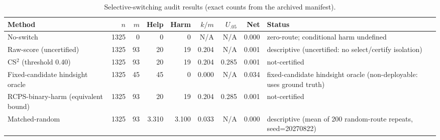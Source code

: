 \begin{table}[t]
\centering
\caption{Selective-switching audit results (exact counts from the archived manifest).}
\label{tab:cs2_main}
\begin{tabular}{lrrrrrrrl}
\toprule
Method & $n$ & $m$ & Help & Harm & $k/m$ & $U_{.05}$ & Net & Status \\
\midrule
No-switch & 1325 & 0 & 0 & 0 & N/A & N/A & 0.000 & zero-route; conditional harm undefined \\
Raw-score (uncertified) & 1325 & 93 & 20 & 19 & 0.204 & N/A & 0.001 & descriptive (uncertified: no select/certify isolation) \\
CS$^2$ (threshold 0.40) & 1325 & 93 & 20 & 19 & 0.204 & 0.285 & 0.001 & not-certified \\
Fixed-candidate hindsight oracle & 1325 & 45 & 45 & 0 & 0.000 & N/A & 0.034 & fixed-candidate hindsight oracle (non-deployable: uses ground truth) \\
RCPS-binary-harm (equivalent bound) & 1325 & 93 & 20 & 19 & 0.204 & 0.285 & 0.001 & not-certified \\
Matched-random & 1325 & 93 & 3.310 & 3.100 & 0.033 & N/A & 0.000 & descriptive (mean of 200 random-route repeats, seed=20270822) \\
\bottomrule
\end{tabular}
\end{table}
